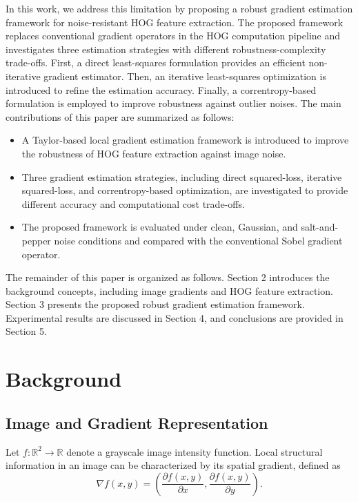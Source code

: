 \documentclass{elsarticle}
\begin{document}
In this work, we address this limitation by proposing a robust gradient estimation framework for noise-resistant HOG feature extraction. The proposed framework replaces conventional gradient operators in the HOG computation pipeline and investigates three estimation strategies with different robustness-complexity trade-offs. First, a direct least-squares formulation provides an efficient non-iterative gradient estimator. Then, an iterative least-squares optimization is introduced to refine the estimation accuracy. Finally, a correntropy-based formulation is employed to improve robustness against outlier noises. The main contributions of this paper are summarized as follows:

\begin{itemize}
	\item A Taylor-based local gradient estimation framework is introduced to improve the robustness of HOG feature extraction against image noise.
	\item Three gradient estimation strategies, including direct squared-loss, iterative squared-loss, and correntropy-based optimization, are investigated to provide different accuracy and computational cost trade-offs.
	\item The proposed framework is evaluated under clean, Gaussian, and salt-and-pepper noise conditions and compared with the conventional Sobel gradient operator.
\end{itemize}

The remainder of this paper is organized as follows. Section 2 introduces the background concepts, including image gradients and HOG feature extraction. Section 3 presents the proposed robust gradient estimation framework. Experimental results are discussed in Section 4, and conclusions are provided in Section 5. 
\section{Background}

\subsection{Image and Gradient Representation}

Let $ f : \mathbb{R}^2 \rightarrow \mathbb{R} $ denote a grayscale image intensity function. Local structural information in an image can be characterized by its spatial gradient, defined as
\begin{equation}
	\nabla f(x,y) = \left( \frac{\partial f(x,y)}{\partial x}, \frac{\partial f(x,y)}{\partial y} \right).
\end{equation}
\end{document}
